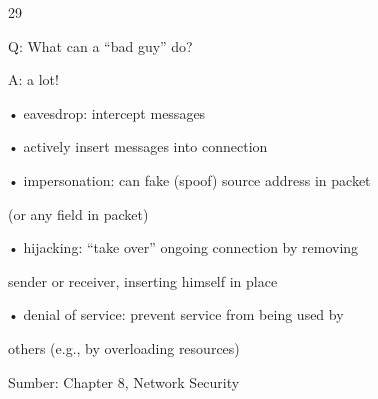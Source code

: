 \documentclass{article}
\begin{document}

29

Q: What can a “bad guy” do?

A: a lot!

• eavesdrop: intercept messages

• actively insert messages into connection

• impersonation: can fake (spoof) source address in packet 

(or any field in packet)

• hijacking: “take over” ongoing connection by removing 

sender or receiver, inserting himself in place

• denial of service: prevent service from being used by 

others (e.g.,  by overloading resources)

Sumber: Chapter 8, Network Security
\end{document}

